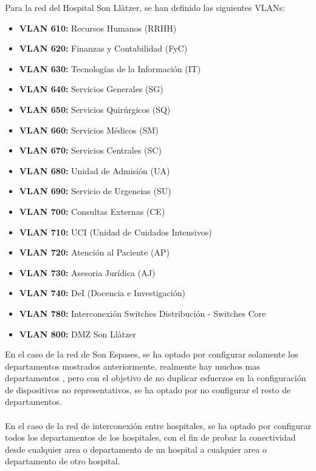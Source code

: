 Para la red del Hospital Son Llàtzer, se han definido las siguientes VLANs:
\begin{itemize}
    \item \textbf{VLAN 610:} Recursos Humanos (RRHH)
    \item \textbf{VLAN 620:} Finanzas y Contabilidad (FyC)
    \item \textbf{VLAN 630:} Tecnologías de la Información (IT)
    \item \textbf{VLAN 640:} Servicios Generales (SG)
    \item \textbf{VLAN 650:} Servicios Quirúrgicos (SQ)
    \item \textbf{VLAN 660:} Servicios Médicos (SM)
    \item \textbf{VLAN 670:} Servicios Centrales (SC)
    \item \textbf{VLAN 680:} Unidad de Admisión (UA)
    \item \textbf{VLAN 690:} Servicio de Urgencias (SU)
    \item \textbf{VLAN 700:} Consultas Externas (CE)
    \item \textbf{VLAN 710:} UCI (Unidad de Cuidados Intensivos)
    \item \textbf{VLAN 720:} Atención al Paciente (AP)
    \item \textbf{VLAN 730:} Asesoria Jurídica (AJ)
    \item \textbf{VLAN 740:} DeI (Docencia e Investigación)
    \item \textbf{VLAN 780:} Interconexión Switches Distribución - Switches Core
    \item \textbf{VLAN 800:} DMZ Son Llàtzer
\end{itemize}

En el caso de la red de Son Espases, se ha optado por configurar solamente los departamentos mostrados anteriormente, realmente hay muchos mas departamentos \cite{GerenciaSonEspases}, pero con el objetivo
de no duplicar esfuerzos en la configuración de dispositivos no representativos, se ha optado por no configurar el resto de departamentos.
\\ \\
En el caso de la red de interconexión entre hospitales, se ha optado por configurar todos los departamentos de los hospitales, con el fin de probar la conectividad desde cualquier area o 
departamento de un hospital a cualquier area o departamento de otro hospital.

